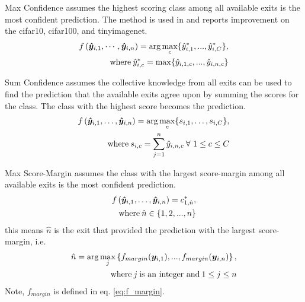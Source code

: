 \begin{enumdescript}
\begin{enumdescript}
		\item[Max Confidence] assumes the highest scoring class among all available exits is the most confident prediction. The method is used in \cite{kaya_shallow-deep_nodate} and reports improvement on the \gls{cifar10}, \gls{cifar100}, and \gls{tinyimagenet}. 
		\begin{align}
		\begin{split}
		f\left(\bm{\hat{y}}_{i,1}, \cdots, \bm{\hat{y}}_{i,n} \right) =  \arg \underset{c}{\max} \{\hat{y}^*_{i,1}, ..., \hat{y}^*_{i,C} \},
		\\ \text{where\:} \hat{y}^*_{i,c} = \max \{\hat{y}_{i,1,c}, ..., \hat{y}_{i,n,c}\}
		\end{split}	
		\end{align}
		\item[Sum Confidence] assumes the collective knowledge from all exits can be used to find the prediction that the available exits agree upon by summing the scores for the class. The class with the highest score becomes the prediction.
		\begin{align}
		\begin{split}
		f\left(\bm{\hat{y}}_{i,1}, \dots, \bm{\hat{y}}_{i,n} \right) = \arg \underset{c}{\max} \{s_{i,1}, \dots, s_{i,C}\}, \\ \text{where\:} s_{i,c} = \sum_{j=1}^{n}\hat{y}_{i,n,c}\: \forall \ 1\le c \le C
		\end{split}
		\end{align}			
		\item[Max Score-Margin] assumes the class with the largest score-margin among all available exits is the most confident prediction. 			\begin{align}
		\begin{split}
		f\left(\bm{\hat{y}}_{i,1}, \dots, \bm{\hat{y}}_{i,n} \right) =c^*_{1,\hat{n}},\\
		\text{where\:} \hat{n} \in \{1, 2, ..., n\}
		\end{split}	
		\end{align}
		this means $ \hat{n} $ is the exit that provided the prediction with the largest score-margin, i.e.
		\begin{align*}
		\begin{split}
		\hat{n} = \arg \underset{j}{\max} \left\{f_{margin}(\bm{y}_{i,1}), ..., f_{margin}(\bm{y}_{i,n})\right\} ,\\
		\text{where\:} j \text{\:is an integer and\:} 1 \le j \le n
		\end{split}
		\end{align*}
		Note, $ f_{margin} $ is defined in eq. \ref{eq:f_margin}.
	\end{enumdescript}
	

\end{enumdescript}
